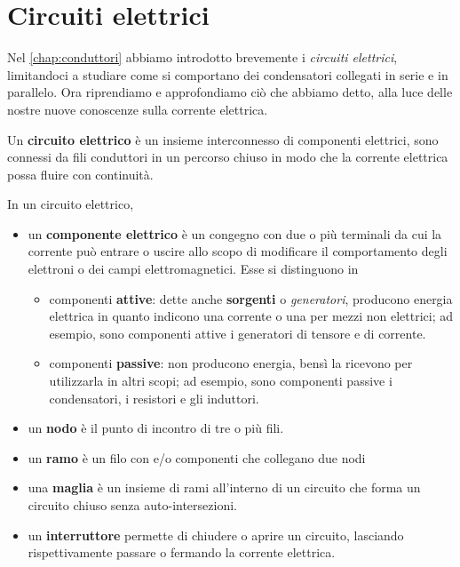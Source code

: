 \section{Circuiti elettrici}
Nel \autoref{chap:conduttori} abbiamo introdotto brevemente i \textit{circuiti elettrici}, limitandoci a studiare come si comportano dei condensatori collegati in serie e in parallelo. Ora riprendiamo e approfondiamo ciò che abbiamo detto, alla luce delle nostre nuove conoscenze sulla corrente elettrica.
\begin{define}
	Un \textbf{circuito elettrico} è un insieme interconnesso di componenti elettrici, sono connessi da fili conduttori in un percorso chiuso in modo che la corrente elettrica possa fluire con continuità.
\end{define}
\begin{define}
	In un circuito elettrico,
	\begin{itemize}
		\item un \textbf{componente elettrico} è un congegno con due o più terminali da cui la corrente può entrare o uscire allo scopo di modificare il comportamento degli elettroni o dei campi elettromagnetici. Esse si distinguono in
		\begin{itemize}
			\item componenti \textbf{attive}: dette anche \textbf{sorgenti} o \textit{generatori}, producono energia elettrica in quanto indicono una corrente o una \ddp per mezzi non elettrici; ad esempio, sono componenti attive i generatori di tensore e di corrente.
			\item componenti \textbf{passive}: non producono energia, bensì la ricevono per utilizzarla in altri scopi; ad esempio, sono componenti passive  i condensatori, i resistori e gli induttori. 
		\end{itemize}
		\item un \textbf{nodo} è il punto di incontro di tre o più fili.
		\item un \textbf{ramo} è un filo con e/o componenti che collegano due nodi 
		\item una \textbf{maglia} è un insieme di rami all'interno di un circuito che forma un circuito chiuso senza auto-intersezioni.
		\item un \textbf{interruttore} permette di chiudere o aprire un circuito, lasciando rispettivamente passare o fermando la corrente elettrica.
	\end{itemize}
\end{define}
